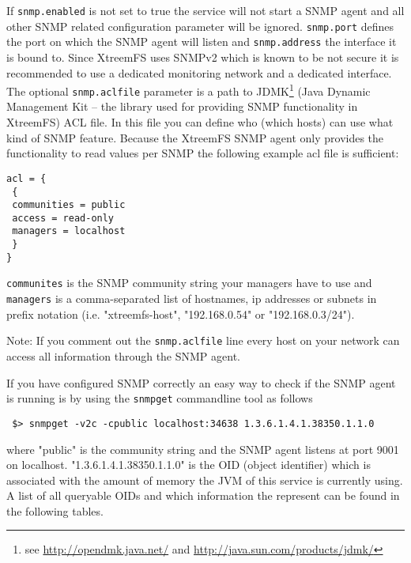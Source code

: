 \documentclass[a4paper,10pt]{book}
\begin{document}
If \texttt{snmp.enabled} is not set to true the service will not start a SNMP agent and all other SNMP related configuration parameter will be ignored.  \texttt{snmp.port} defines the port on which the SNMP agent will listen and \texttt{snmp.address} the interface it is bound to. Since XtreemFS uses SNMPv2 which is known to be not secure it is recommended to use a dedicated monitoring network and a dedicated interface. The optional \texttt{snmp.aclfile} parameter is a path to JDMK\footnote{see \url{http://opendmk.java.net/} and \url{http://java.sun.com/products/jdmk/}} (Java Dynamic Management Kit -- the library used for providing SNMP functionality in XtreemFS) ACL file. In this file you can define who (which hosts) can use what kind of SNMP feature. Because the XtreemFS SNMP agent only provides the functionality to read values per SNMP the following example acl file is sufficient:
\begin{verbatim}
acl = {
 {
 communities = public
 access = read-only
 managers = localhost
 }
}
\end{verbatim}
\texttt{communites} is the SNMP community string your managers have to use and \texttt{managers} is a comma-separated list of hostnames, ip addresses or subnets in prefix notation (i.e. "xtreemfs-host", "192.168.0.54" or "192.168.0.3/24").

Note: If you comment out the \texttt{snmp.aclfile} line every host on your network can access all information through the SNMP agent.

If you have configured SNMP correctly an easy way to check if the SNMP agent is running is by using the \texttt{snmpget} commandline tool as follows
\begin{verbatim}
 $> snmpget -v2c -cpublic localhost:34638 1.3.6.1.4.1.38350.1.1.0
\end{verbatim}
where "public" is the community string and the SNMP agent listens at port 9001 on localhost. "1.3.6.1.4.1.38350.1.1.0" is the OID (object identifier) which is associated with the amount of memory the JVM of this service is currently using. A list of all queryable OIDs and which information the represent can be found in the following tables.
\end{document}
